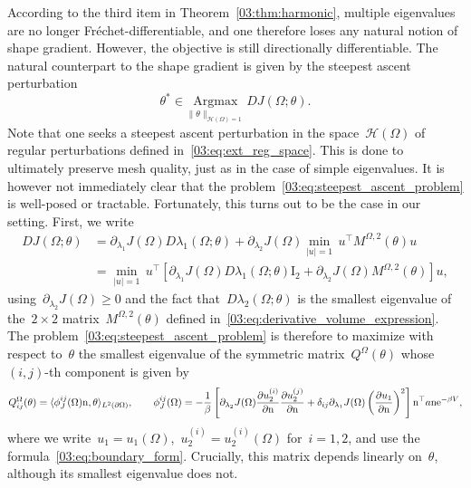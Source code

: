 According to the third item in Theorem~\ref{03:thm:harmonic}, multiple eigenvalues are no longer Fréchet-differentiable, and one therefore loses any natural notion of shape gradient. However, the objective is still directionally differentiable. The natural counterpart to the shape gradient is given by the steepest ascent perturbation
\begin{equation}
    \label{03:eq:steepest_ascent_problem}
    \theta^*\in\underset{\|\theta\|_{\mathcal H(\Omega)=1}}{\mathrm{Argmax}}\,DJ(\Omega;\theta).
\end{equation}
Note that one seeks a steepest ascent perturbation in the space~$\mathcal H(\Omega)$ of regular perturbations defined in~\eqref{03:eq:ext_reg_space}. This is done to ultimately preserve mesh quality, just as in the case of simple eigenvalues. It is however not immediately clear that the problem~\eqref{03:eq:steepest_ascent_problem} is well-posed or tractable. Fortunately, this turns out to be the case in our setting. First, we write
\begin{equation}
    \begin{aligned}
    DJ(\Omega;\theta) &= \partial_{\lambda_1} J(\Omega)D\lambda_1(\Omega;\theta)+\partial_{\lambda_2} J(\Omega)\underset{|u|=1}{\min}\,u^\top M^{\Omega,2}(\theta)u\\
    &= \underset{|u|=1}{\min}\,u^\top\left[\partial_{\lambda_1} J(\Omega)D\lambda_1(\Omega;\theta)\mathrm{I}_{2}+\partial_{\lambda_2} J(\Omega)M^{\Omega,2}(\theta)\right] u,
    \end{aligned}
\end{equation}
using~$\partial_{\lambda_2}J(\Omega)\geq 0$ and the fact that~$D\lambda_2(\Omega;\theta)$ is the smallest eigenvalue of the~$2\times2$ matrix~$M^{\Omega,2}(\theta)$ defined in~\eqref{03:eq:derivative_volume_expression}. The problem~\eqref{03:eq:steepest_ascent_problem} is therefore to maximize with respect to~$\theta$ the smallest eigenvalue of the symmetric matrix~$Q^\Omega(\theta)$ whose~$(i,j)$-th component is given by
\begin{equation}
    \label{03:eq:perturbation_matrix_J_boundary_form}
    Q_{ij}^{\Omega}(\theta) = \langle \phi^{ij}_{J}(\Omega)\mathrm{n},\theta\rangle_{L^2(\partial\Omega)},\qquad \phi^{ij}_{J}(\Omega) = -\frac1\beta\left[\partial_{\lambda_2} J(\Omega)\frac{\partial u_2^{(i)}}{\partial\mathrm{n}}\frac{\partial u_2^{(j)}}{\partial\mathrm{n}} +\delta_{ij}\partial_{\lambda_1} J(\Omega)\left(\frac{\partial u_1}{\partial\mathrm{n}}\right)^2\right]\mathrm{n}^\top a\mathrm{n}\mathrm{e}^{-\beta V},
\end{equation}
where we write~$u_1=u_1(\Omega)$,~$u_2^{{(i)}}=u_2^{(i)}(\Omega)$ for~$i=1,2$, and use the formula~\eqref{03:eq:boundary_form}. Crucially, this matrix depends linearly on~$\theta$, although its smallest eigenvalue does not.

